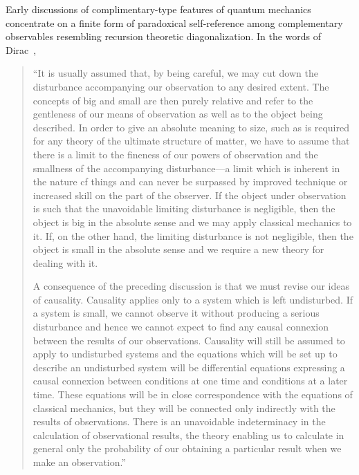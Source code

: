 \documentclass[%
 preprint,
 showpacs,
 showkeys,
 preprintnumbers,
 amsmath,amssymb,
 aps,
 prl,
  longbibliography,
 ]{revtex4-1}
\begin{document}
Early discussions of complimentary-type features of quantum mechanics \cite{Heisenberg-27,vonNeumann:1927:WAQ}
concentrate on a finite form of paradoxical self-reference among complementary observables resembling recursion theoretic diagonalization. In the words of Dirac~\cite[\S 1]{dirac},
\begin{quote}
{  ``It is usually assumed that, by being careful, we may cut down the
disturbance accompanying our observation to any desired extent.
The concepts of big and small are then purely relative and refer to the
gentleness of our means of observation as well as to the object being
described. In order to give an absolute meaning to size, such as is
required for any theory of the ultimate structure of matter, we have
to assume that there is a limit to the fineness of our powers of observation
and the smallness of the accompanying disturbance---a limit which is
inherent in the nature cf things and can never be surpassed by improved
technique or increased skill on the part of the observer. If the object under
observation is such that the unavoidable limiting disturbance is negligible,
then the object is big in the absolute sense and we may apply
classical mechanics to it. If, on the other hand, the limiting disturbance
is not negligible, then the object is small in the absolute
sense and we require a new theory for dealing with it.

A consequence of the preceding discussion is that we must revise
our ideas of causality. Causality applies only to a system which is
left undisturbed. If a system is small, we cannot observe it without
producing a serious disturbance and hence we cannot expect to find
any causal connexion between the results of our observations.
Causality will still be assumed to apply to undisturbed systems and
the equations which will be set up to describe an undisturbed system
will be differential equations expressing a causal connexion between
conditions at one time and conditions at a later time. These equations
will be in close correspondence with the equations of classical
mechanics, but they will be connected only indirectly with the results
of observations. There is an unavoidable indeterminacy in the calculation
of observational results, the theory enabling us to calculate in
general only the probability of our obtaining a particular result when
we make an observation.''}
\end{quote}
\end{document}
